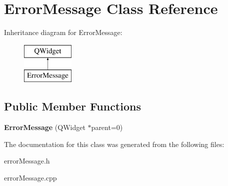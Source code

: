\hypertarget{class_error_message}{}\section{Error\+Message Class Reference}
\label{class_error_message}
Inheritance diagram for Error\+Message\+:\begin{figure}[H]
\begin{center}
\leavevmode
\includegraphics[height=2.000000cm]{class_error_message}
\end{center}
\end{figure}
\subsection*{Public Member Functions}
\begin{DoxyCompactItemize}
\item 
\mbox{\label{class_error_message_ad84a0706d3bc0e5495480f19c6c72f8f}} 
{\bfseries Error\+Message} (Q\+Widget $\ast$parent=0)
\end{DoxyCompactItemize}


The documentation for this class was generated from the following files\+:\begin{DoxyCompactItemize}
\item 
error\+Message.\+h\item 
error\+Message.\+cpp\end{DoxyCompactItemize}

